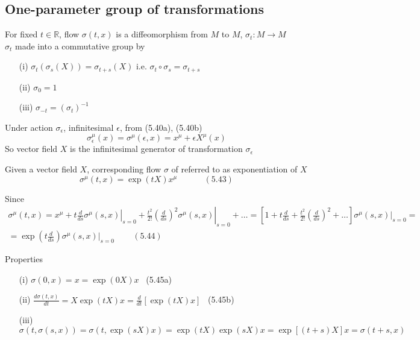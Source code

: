 \documentclass{book}
\begin{document}
\subsection{ One-parameter group of transformations}

For fixed $t\in \mathbb{R}$, flow $\sigma(t,x)$ is a diffeomorphism from $M$ to $M$, $\sigma_t : M \to M$ \\
$\sigma_t$ made into a commutative group by 
\begin{enumerate}
\item[(i)] $\sigma_t(\sigma_s(X)) = \sigma_{t+s}(X)$ i.e. $\sigma_t \circ \sigma_s = \sigma_{t+s}$ 
\item[(ii)] $\sigma_0 = 1$ 
\item[(iii)] $\sigma_{-t} = (\sigma_t)^{-1}$
\end{enumerate}

Under action $\sigma_{\epsilon}$, infinitesimal $\epsilon$, from (5.40a), (5.40b)
\[
\sigma_{\epsilon}^{\mu}(x) = \sigma^{\mu}(\epsilon, x) = x^{\mu} + \epsilon X^{\mu}(x)
\]
So vector field $X$ is the infinitesimal generator of transformation $\sigma_{\epsilon}$

Given a vector field $X$, corresponding flow $\sigma$ of referred to as exponentiation of $X$
\[
\sigma^{\mu}(t,x) = \exp{ (tX) } x^{\mu} \quad \quad \quad \, (5.43)
\]

Since 
\[
\begin{gathered}
\sigma^{\mu}(t,x) = x^{\mu} + t \left. \frac{d}{ds} \sigma^{\mu}(s,x) \right|_{s=0} + \frac{t^2}{2!} \left. \left( \frac{d}{ds} \right)^2 \sigma^{\mu}(s,x) \right|_{s=0} + \dots = \left[ 1 + t \frac{d}{ds} + \frac{t^2}{2!} \left( \frac{d}{ds} \right)^2 + \dots \right] \left. \sigma^{\mu}(s,x) \right|_{s=0} = \\
= \exp{ \left( t \frac{d}{ds} \right) } \left. \sigma^{\mu}(s,x) \right|_{s =0 } \quad \quad \, (5.44) 
\end{gathered}
\]

Properties
\begin{enumerate}
\item[(i)] $\sigma(0,x) = x = \exp{ ( 0X) } x $ \quad \quad \quad \, (5.45a) 
\item[(ii)] $\frac{ d\sigma (t,x) }{ dt} = X\exp{(tX)}x = \frac{d}{dt} [ \exp{ (tX) } x ]$ \quad \quad \quad \, (5.45b)
\item[(iii)] $\sigma(t,\sigma(s,x) ) = \sigma(t, \exp{(sX)} x) = \exp{ (tX)} \exp{(sX) }x = \exp{ [ (t+s) X ] }x = \sigma(t+s,x)$
\end{enumerate}
\end{document}
